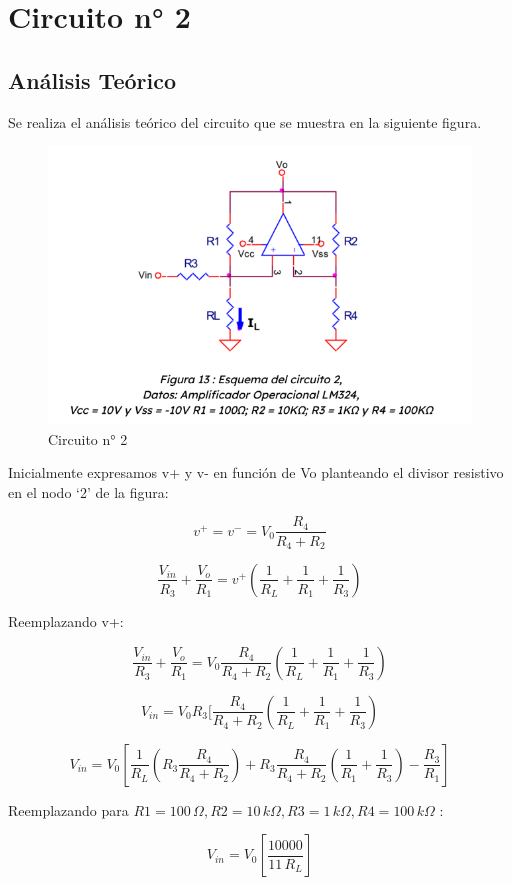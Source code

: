 \section{Circuito n° 2}

\subsection{Análisis Teórico}

Se realiza el análisis teórico del circuito que se muestra en la siguiente figura. 


\begin{figure}[h!]
    \centering
    \includegraphics[width=0.70\linewidth]{Secciones/Circuito2/imgCirc2.png}
    \caption{Circuito n° 2}
    \label{fig:Circuito2}
\end{figure}


Inicialmente expresamos v+ y v- en función de Vo planteando el divisor resistivo en el nodo ‘2’ de la figura:

\[v^+ = v^- = V_0  \frac{R_4}{R_4 + R_2} \]

\[\frac{V_{in}}{R_3} + \frac{V_o}{R_1} = v^+ (\frac{1}{R_L}+\frac{1}{R_1}+\frac{1}{R_3}) \]

Reemplazando v+:

\[\frac{V_{in}}{R_3} + \frac{V_o}{R_1} = V_0  \frac{R_4}{R_4 + R_2} (\frac{1}{R_L}+\frac{1}{R_1}+\frac{1}{R_3})\]

\[{V_{in}} = V_0  R_3 [ \frac{R_4}{R_4 + R_2} (\frac{1}{R_L}+\frac{1}{R_1}+\frac{1}{R_3})\]

\[{V_{in}} = V_0 \left[ \frac{1}{R_L}(R_3 \frac{R_4}{R_4 + R_2}) + R_3\frac{R_4}{R_4 + R_2}(\frac{1}{R_1}+\frac{1}{R_3})-\frac{R_3}{R_1} \right] \]

Reemplazando para $ R1 = 100\,\Omega, R2 = 10\,k\Omega, R3 = 1\,k\Omega, R4 = 100\,k\Omega $ :

\[{V_{in}} = V_0 \left[ \frac{10000}{11\,R_L} \right]\]


